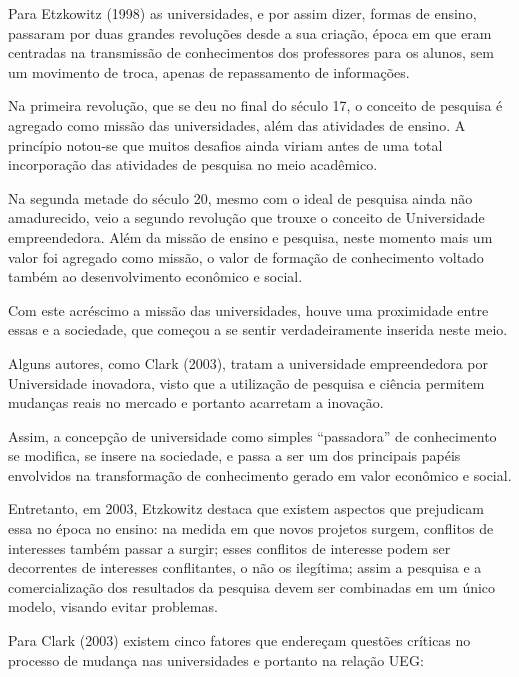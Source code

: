 Para Etzkowitz (1998) as universidades, e por assim dizer, formas de ensino, passaram por duas grandes revoluções desde a sua criação, época em que eram centradas na transmissão de conhecimentos dos professores para os alunos, sem um movimento de troca, apenas de repassamento de informações.

Na primeira revolução, que se deu no final do século 17, o conceito de pesquisa é agregado como missão das universidades, além das atividades de ensino. A princípio notou-se que muitos desafios ainda viriam antes de uma total incorporação das atividades de pesquisa no meio acadêmico.

Na segunda metade do século 20, mesmo com o ideal de pesquisa ainda não amadurecido, veio a segundo revolução que trouxe o conceito de Universidade empreendedora. Além da missão de ensino e pesquisa, neste momento mais um valor foi agregado como missão, o valor de formação de conhecimento voltado também ao desenvolvimento econômico e social.

Com este acréscimo a missão das universidades, houve uma proximidade entre essas e a sociedade, que começou a se sentir verdadeiramente inserida neste meio.

Alguns autores, como Clark (2003), tratam a universidade empreendedora por Universidade inovadora, visto que a utilização de pesquisa e ciência permitem mudanças reais no mercado e portanto acarretam a inovação.

Assim, a concepção de universidade como simples “passadora” de conhecimento se modifica, se insere na sociedade, e passa a ser um dos principais papéis envolvidos na transformação de conhecimento gerado em valor econômico e social.

Entretanto, em 2003, Etzkowitz destaca que existem aspectos que prejudicam essa no época no ensino: na medida em que novos projetos surgem, conflitos de interesses também passar a surgir; esses conflitos de interesse podem ser decorrentes de interesses conflitantes, o não os ilegítima; assim a pesquisa e a comercialização dos resultados da pesquisa devem ser combinadas em um único modelo, visando evitar problemas.

Para Clark (2003) existem cinco fatores que endereçam questões críticas no processo de mudança nas universidades e portanto na relação UEG:

